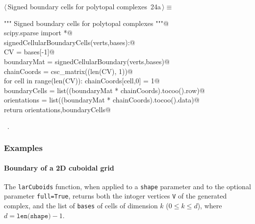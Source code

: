 \documentclass[11pt,oneside]{article}	%
\begin{document}
\begin{flushleft} \small \label{scrap41}
\protect{}$\langle\,$Signed boundary cells for polytopal complexes\nobreak\ {\footnotesize 24a}$\,\rangle\equiv$
\vspace{-1ex}
\begin{list}{}{} \item
\mbox{}\verb@""" Signed boundary cells for polytopal complexes """@\\
\mbox{}\verb@from scipy.sparse import *@\\
\mbox{}\verb@def signedCellularBoundaryCells(verts,bases):@\\
\mbox{}\verb@   CV = bases[-1]@\\
\mbox{}\verb@   boundaryMat = signedCellularBoundary(verts,bases)@\\
\mbox{}\verb@   chainCoords = csc_matrix((len(CV), 1))@\\
\mbox{}\verb@   for cell in range(len(CV)): chainCoords[cell,0] = 1@\\
\mbox{}\verb@   boundaryCells = list((boundaryMat * chainCoords).tocoo().row)@\\
\mbox{}\verb@   orientations = list((boundaryMat * chainCoords).tocoo().data)@\\
\mbox{}\verb@   return orientations,boundaryCells@\\
\mbox{}\verb@@{\NWsep}
\end{list}
\vspace{-1ex}
\footnotesize\addtolength{\baselineskip}{-1ex}
\begin{list}{}{\setlength{\itemsep}{-\parsep}\setlength{\itemindent}{-\leftmargin}}
\item \NWtxtMacroRefIn\ .
\end{list}
\end{flushleft}

\subsubsection{Examples}

\paragraph{Boundary of a 2D cuboidal grid}
The \texttt{larCuboids} function, when applied to a \texttt{shape} parameter and to the optional parameter \texttt{full=True}, returns both the intoger vertices \texttt{V} of the generated complex, and the list of \texttt{bases} of cells of dimension $k$ ($0\leq k\leq d$), where $d = \texttt{len(shape)}-1$.
\end{document}
